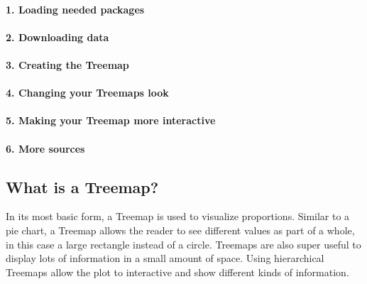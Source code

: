 \documentclass[
]{article}
\begin{document}
\hypertarget{loading-needed-packages}{%
\paragraph{\texorpdfstring{ 1. Loading needed packages
}{ 1. Loading needed packages }}\label{loading-needed-packages}}

\hypertarget{downloading-data}{%
\paragraph{\texorpdfstring{ 2. Downloading
data}{ 2. Downloading data}}\label{downloading-data}}

\hypertarget{creating-the-treemap}{%
\paragraph{\texorpdfstring{ 3. Creating the
Treemap}{ 3. Creating the Treemap}}\label{creating-the-treemap}}

\hypertarget{changing-your-treemaps-look}{%
\paragraph{\texorpdfstring{ 4. Changing your Treemaps
look}{ 4. Changing your Treemaps look}}\label{changing-your-treemaps-look}}

\hypertarget{making-your-treemap-more-interactive}{%
\paragraph{\texorpdfstring{ 5. Making your Treemap more
interactive}{ 5. Making your Treemap more interactive}}\label{making-your-treemap-more-interactive}}

\hypertarget{more-sources}{%
\paragraph{\texorpdfstring{ 6. More
sources}{ 6. More sources}}\label{more-sources}}

\hypertarget{what-is-a-treemap}{%
\subsection{What is a Treemap?}\label{what-is-a-treemap}}

In its most basic form, a Treemap is used to visualize proportions.
Similar to a pie chart, a Treemap allows the reader to see different
values as part of a whole, in this case a large rectangle instead of a
circle. Treemaps are also super useful to display lots of information in
a small amount of space. Using hierarchical Treemaps allow the plot to
interactive and show different kinds of information.
\end{document}
